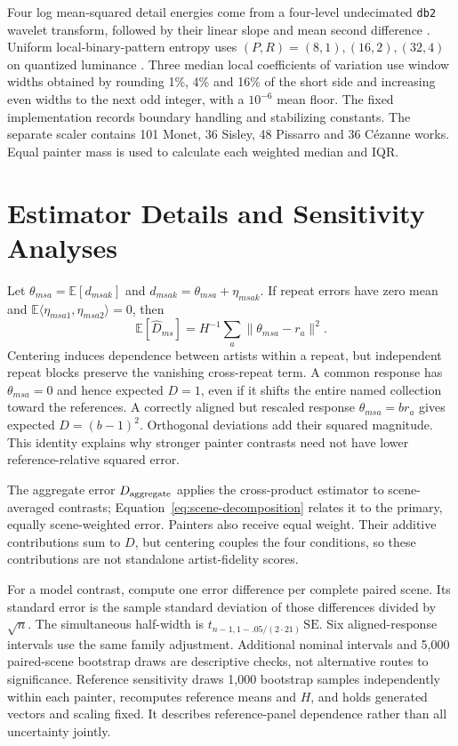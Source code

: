 Four log mean-squared detail energies come from a four-level undecimated
\texttt{db2} wavelet transform, followed by their linear slope and mean second
difference \citep{mallat1989wavelet}. Uniform local-binary-pattern entropy uses
$(P,R)=(8,1),(16,2),(32,4)$ on quantized luminance
\citep{ojala2002lbp}. Three median local coefficients of variation use window
widths obtained by rounding 1\%, 4\% and 16\% of the short side and increasing
even widths to the next odd integer, with a $10^{-6}$ mean floor.
The fixed implementation records boundary handling and stabilizing
constants. The separate scaler contains 101 Monet, 36 Sisley, 48 Pissarro and
36 C\'ezanne works. Equal painter mass is used to calculate each weighted
median and IQR.

\section{Estimator Details and Sensitivity Analyses}\label{app:estimation}
Let $\theta_{msa}=\mathbb E[d_{msak}]$ and
$d_{msak}=\theta_{msa}+\eta_{msak}$. If repeat errors have zero mean and
$\mathbb E\langle\eta_{msa1},\eta_{msa2}\rangle=0$, then
\[
 \mathbb E[\widehat D_{ms}]
 =H^{-1}\sum_a\|\theta_{msa}-r_a\|^2.
\]
Centering induces dependence between artists within a repeat, but independent
repeat blocks preserve the vanishing cross-repeat term. A common response has
$\theta_{msa}=0$ and hence expected $D=1$, even if it shifts the entire named
collection toward the references. A correctly aligned but rescaled response
$\theta_{msa}=b r_a$ gives expected $D=(b-1)^2$. Orthogonal deviations add their
squared magnitude. This identity explains why stronger painter contrasts need not have lower
reference-relative squared error.

The aggregate error $D_{\rm aggregate}$ applies the cross-product estimator to scene-averaged
contrasts; Equation~\ref{eq:scene-decomposition} relates it to the primary,
equally scene-weighted error. Painters also receive equal weight. Their
additive contributions sum to $D$, but centering couples the four conditions,
so these contributions are not standalone artist-fidelity scores.

For a model contrast, compute one error difference per complete paired scene.
Its standard error is the sample standard deviation of those differences divided
by $\sqrt n$. The simultaneous half-width is
$t_{n-1,1-.05/(2\cdot21)}\,\mathrm{SE}$. Six aligned-response intervals use the same
family adjustment. Additional nominal intervals and 5,000 paired-scene bootstrap
draws are descriptive checks, not alternative routes to significance. Reference
sensitivity draws 1,000 bootstrap samples independently within each painter,
recomputes reference means and $H$, and holds generated vectors and scaling
fixed. It describes reference-panel dependence rather than all uncertainty
jointly.

